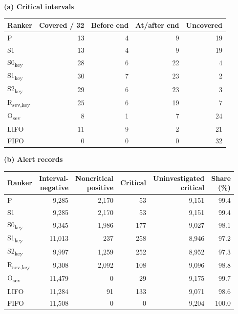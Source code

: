 \documentclass[pdflatex,sn-basic,Numbered]{sn-jnl}
\newcommand{\ReplayInvestigations}{11,508}
\newcommand{\key}{\textsubscript{key}}
\newcommand{\Rsev}{R\textsubscript{sev,key}}
\begin{document}
\begin{tableorg}[t]
\centering
\caption{Replay at 12 alerts per hour, totals over eight scenarios. Each ranker starts \ReplayInvestigations{} investigations. Panel (a) separates coverage before the exclusive interval end from later coverage; panel (b) partitions starts into interval-negative, noncritical interval-positive, and critical records, whose counts sum to the total. Uninvestigated critical records and their share are measured at the scenario horizon.}
\label{tab:replay}
\small
\textbf{(a) Critical intervals}\par\medskip
\begin{tabular}{lrrrr}
\toprule
Ranker & Covered / 32 & Before end & At/after end & Uncovered \\
\midrule
P & 13 & 4 & 9 & 19 \\
S1 & 13 & 4 & 9 & 19 \\
S0\key & 28 & 6 & 22 & 4 \\
S1\key & 30 & 7 & 23 & 2 \\
S2\key & 29 & 6 & 23 & 3 \\
\Rsev & 25 & 6 & 19 & 7 \\
O\textsubscript{sev} & 8 & 1 & 7 & 24 \\
LIFO & 11 & 9 & 2 & 21 \\
FIFO & 0 & 0 & 0 & 32 \\
\bottomrule
\end{tabular}
\par\bigskip\textbf{(b) Alert records}\par\medskip
{\setlength{\tabcolsep}{4pt}
\begin{tabular}{lrrrrr}
\toprule
Ranker & \shortstack{Interval-\\negative} & \shortstack{Noncritical\\positive} & Critical & \shortstack{Uninvestigated\\critical} & \shortstack{Share\\(\%)} \\
\midrule
P & 9,285 & 2,170 & 53 & 9,151 & 99.4 \\
S1 & 9,285 & 2,170 & 53 & 9,151 & 99.4 \\
S0\key & 9,345 & 1,986 & 177 & 9,027 & 98.1 \\
S1\key & 11,013 & 237 & 258 & 8,946 & 97.2 \\
S2\key & 9,997 & 1,259 & 252 & 8,952 & 97.3 \\
\Rsev & 9,308 & 2,092 & 108 & 9,096 & 98.8 \\
O\textsubscript{sev} & 11,479 & 0 & 29 & 9,175 & 99.7 \\
LIFO & 11,284 & 91 & 133 & 9,071 & 98.6 \\
FIFO & 11,508 & 0 & 0 & 9,204 & 100.0 \\
\bottomrule
\end{tabular}
}
\unskip
\end{tableorg}
\end{document}
